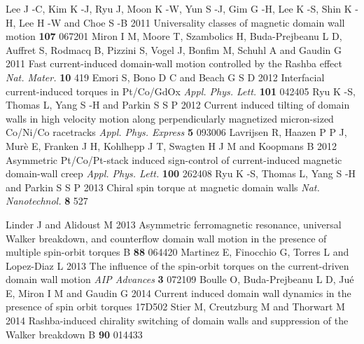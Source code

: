 \documentclass[12pt]{iopart}
\begin{document}
\begin{thebibliography}{99}
 Lee J -C, Kim K -J, Ryu J, Moon K -W, Yun S -J, Gim G -H, Lee K -S, Shin K -H, Lee H -W and Choe S -B 2011 Universality classes of magnetic domain wall motion \PRL \textbf{107} 067201
 Miron I M, Moore T, Szambolics H, Buda-Prejbeanu L D, Auffret S, Rodmacq B, Pizzini S, Vogel J, Bonfim M, Schuhl A and Gaudin G 2011 Fast current-induced domain-wall motion controlled by the Rashba effect {\it Nat. Mater.} {\bf 10} 419
 Emori S, Bono D C and Beach G S D 2012 Interfacial current-induced torques in Pt/Co/GdOx {\it Appl. Phys. Lett.} {\bf 101} 042405
 Ryu K -S, Thomas L, Yang S -H and Parkin S S P 2012 Current induced tilting of domain walls in high velocity motion along perpendicularly magnetized micron-sized Co/Ni/Co racetracks {\it Appl. Phys. Express} {\bf 5} 093006
 Lavrijsen R, Haazen P P J, Mur\`{e} E, Franken J H, Kohlhepp J T, Swagten H J M and Koopmans B 2012 Asymmetric Pt/Co/Pt-stack induced sign-control of current-induced magnetic domain-wall creep {\it Appl. Phys. Lett.} {\bf 100} 262408
 Ryu K -S, Thomas L, Yang S -H and Parkin S S P 2013 Chiral spin torque at magnetic domain walls {\it Nat. Nanotechnol.} {\bf 8} 527


 Linder J and Alidoust M 2013 Asymmetric ferromagnetic resonance, universal Walker breakdown, and counterflow domain wall motion in the presence of multiple spin-orbit torques \PR B {\bf 88} 064420
 Martinez E, Finocchio G, Torres L and Lopez-Diaz L 2013 The influence of the spin-orbit torques on the current-driven domain wall motion {\it AIP Advances} {\bf 3} 072109
 Boulle O, Buda-Prejbeanu L D, Ju\'{e} E, Miron I M and Gaudin G 2014 Current induced domain wall dynamics in the presence of spin orbit torques  17D502
 Stier M, Creutzburg M and Thorwart M 2014 Rashba-induced chirality switching of domain walls and suppression of the Walker breakdown \PR B {\bf 90} 014433


\end{thebibliography}
\end{document}
